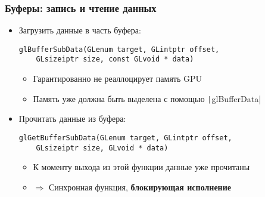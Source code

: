 \documentclass[10pt]{beamer}
\begin{document}
\begin{frame}[fragile]
\frametitle{Буферы: запись и чтение данных}
\begin{itemize}
\item Загрузить данные в часть буфера:
\begin{verbatim}
glBufferSubData(GLenum target, GLintptr offset,
    GLsizeiptr size, const GLvoid * data)
\end{verbatim}
\begin{itemize}
\item Гарантированно не реаллоцирует память GPU
\item Память уже должна быть выделена с помощью \texttt|glBufferData|
\end{itemize}
\pause
\item Прочитать данные из буфера:
\begin{verbatim}
glGetBufferSubData(GLenum target, GLintptr offset,
    GLsizeiptr size, GLvoid * data)
\end{verbatim}
\begin{itemize}
\item К моменту выхода из этой функции данные уже прочитаны
\item \begin{math}\Rightarrow\end{math} Синхронная функция, \textbf{блокирующая исполнение}
\end{itemize}
\end{itemize}
\end{frame}
\end{document}
